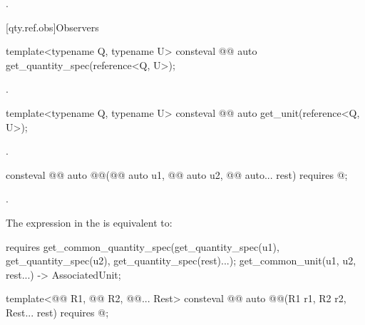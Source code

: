 \begin{itemdescr}
\pnum
\returns
{}.
\end{itemdescr}

[qty.ref.obs]{Observers}

\begin{itemdecl}
template<typename Q, typename U>
consteval @@ auto get_quantity_spec(reference<Q, U>);
\end{itemdecl}

\begin{itemdescr}
\pnum
\returns
{}.
\end{itemdescr}

\begin{itemdecl}
template<typename Q, typename U>
consteval @@ auto get_unit(reference<Q, U>);
\end{itemdecl}

\begin{itemdescr}
\pnum
\returns
{}.
\end{itemdescr}

\begin{itemdecl}
consteval @@ auto @@(@@ auto u1,
                                                   @@ auto u2,
                                                   @@ auto... rest)
  requires @\seebelownc@;
\end{itemdecl}

\begin{itemdescr}
\pnum
\returns
{}.

\pnum
\remarks
The expression in the  is equivalent to:
\begin{codeblock}
requires {
  get_common_quantity_spec(get_quantity_spec(u1), get_quantity_spec(u2),
                           get_quantity_spec(rest)...);
  { get_common_unit(u1, u2, rest...) } -> AssociatedUnit;
}
\end{codeblock}
\end{itemdescr}

\begin{itemdecl}
template<@@ R1, @@ R2, @@... Rest>
consteval @@ auto @@(R1 r1, R2 r2, Rest... rest)
  requires @\seebelownc@;
\end{itemdecl}

